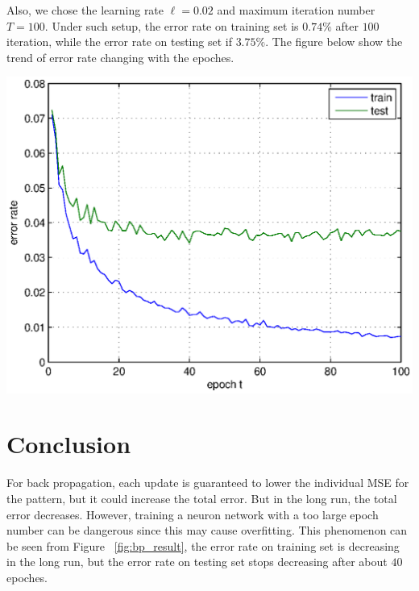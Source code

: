 \documentclass{article} %
\begin{document}
Also, we chose the learning rate $ \ell = 0.02 $ and maximum iteration number $ T = 100 $.
Under such setup, the error rate on training set is $0.74\%$ after $100$ iteration, while the error rate on testing set if $3.75\%$.
The figure below show the trend of error rate changing with the epoches.

\begin{center}
\includegraphics[width=0.6\linewidth]{bp_simul.eps}
\label{fig:bp_result}
\end{center}

\section{Conclusion}
For back propagation, each update is guaranteed to lower the individual MSE for the pattern, but it could increase the total error. 
But in the long run, the total error decreases.
However, training a neuron network with a too large epoch number can be dangerous since this may cause overfitting.
This phenomenon can be seen from Figure ~\ref{fig:bp_result}, the error rate on training set is decreasing in the long run, but the error rate on testing set stops decreasing after about $40$ epoches.

\nocite{*} %
\small{ %

}
\end{document}
